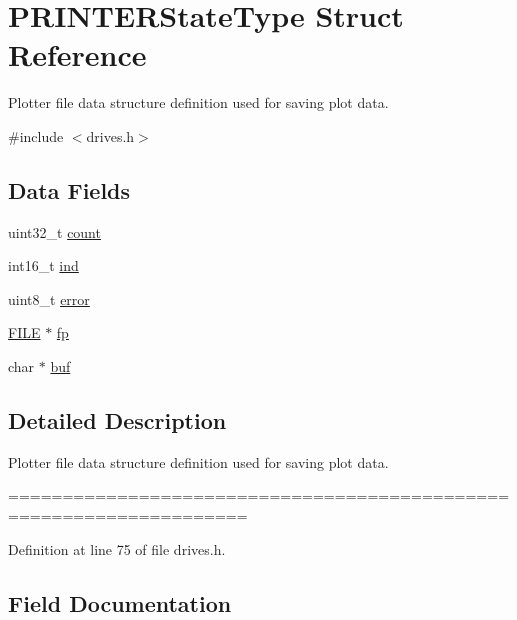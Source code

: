 \hypertarget{structPRINTERStateType}{}\section{P\+R\+I\+N\+T\+E\+R\+State\+Type Struct Reference}
\label{structPRINTERStateType}


Plotter file data structure definition used for saving plot data.  




{\ttfamily \#include $<$drives.\+h$>$}

\subsection*{Data Fields}
\begin{DoxyCompactItemize}
\item 
uint32\+\_\+t \hyperlink{structPRINTERStateType_ae115fc351910f3801e37b31f254fb8f4}{count}
\item 
int16\+\_\+t \hyperlink{structPRINTERStateType_a7d8873d0011f31d7dd00c2b7e0d362bd}{ind}
\item 
uint8\+\_\+t \hyperlink{structPRINTERStateType_a6e5b550f5396901febd5475445132dd0}{error}
\item 
\hyperlink{posix_8h_aed4dabeb9f7c518ded42f930a04abce8}{F\+I\+LE} $\ast$ \hyperlink{structPRINTERStateType_a791c78d68d169f9d2e60d34b890e520a}{fp}
\item 
char $\ast$ \hyperlink{structPRINTERStateType_aa48220761aa3c77c954a55f09388c615}{buf}
\end{DoxyCompactItemize}


\subsection{Detailed Description}
Plotter file data structure definition used for saving plot data. 

==================================================================== 

Definition at line 75 of file drives.\+h.



\subsection{Field Documentation}
